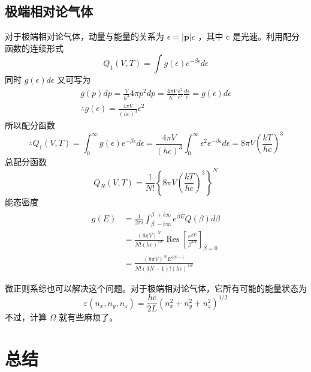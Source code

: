 \subsection{极端相对论气体}
对于极端相对论气体，动量与能量的关系为 $\epsilon = |\bm{p}| c$ ，其中 c 是光速。利用配分函数的连续形式
\[
    Q_1(V, T)=\int g(\epsilon) e^{-\beta \epsilon} d \epsilon
\]
同时 $g(\epsilon) d \epsilon$ 又可写为
\begin{equation}
    \begin{gathered}
        g(p) d p=\frac{V}{h^3} 4 \pi p^2 d p=\frac{4 \pi V}{h^3} \frac{\epsilon^2}{c^2} \frac{d \epsilon}{c}=g(\epsilon) d \epsilon \\
        \therefore g(\epsilon)=\frac{4 \pi V}{(h c)^3} \epsilon^2
        \end{gathered}
\end{equation}
所以配分函数
\begin{equation}
    \therefore Q_1(V, T)=\int_0^{\infty} g(\epsilon)e^{-\beta \epsilon} d \epsilon=\frac{4 \pi V}{(h c)^3} \int_0^{\infty} \epsilon^2 e^{-\beta \epsilon} d \epsilon=8 \pi V\left(\frac{k T}{h c}\right)^3
\end{equation}
总配分函数
\begin{equation}
    Q_N(V, T)=\frac{1}{N !}\left\{8 \pi V\left(\frac{k T}{h c}\right)^3\right\}^N
\end{equation}
能态密度
\begin{equation}
    \begin{aligned}
        g(E) & =\frac{1}{2 \pi i} \int_{\beta^{\prime}-i \infty}^{\beta^{\prime}+i \infty} e^{\beta E} Q(\beta) d \beta \\
        & =\frac{(8 \pi V)^N}{N !(h c)^{3 N}} \operatorname{Res}\left[\frac{e^{\beta E}}{\beta^{3 N}}\right]_{\beta=0} \\
        & =\frac{(8 \pi V)^N E^{3 N-1}}{N !(3 N-1) !(h c)^{3 N}}
        \end{aligned}
\end{equation}

微正则系综也可以解决这个问题。对于极端相对论气体，它所有可能的能量状态为
\begin{equation}
    \varepsilon\left(n_x, n_y, n_z\right)=\frac{h c}{2 L}\left(n_x^2+n_y^2+n_z^2\right)^{1 / 2}
\end{equation}
不过，计算 $\Omega$ 就有些麻烦了。

\section{总结}\label{sec:正则系综总结}

